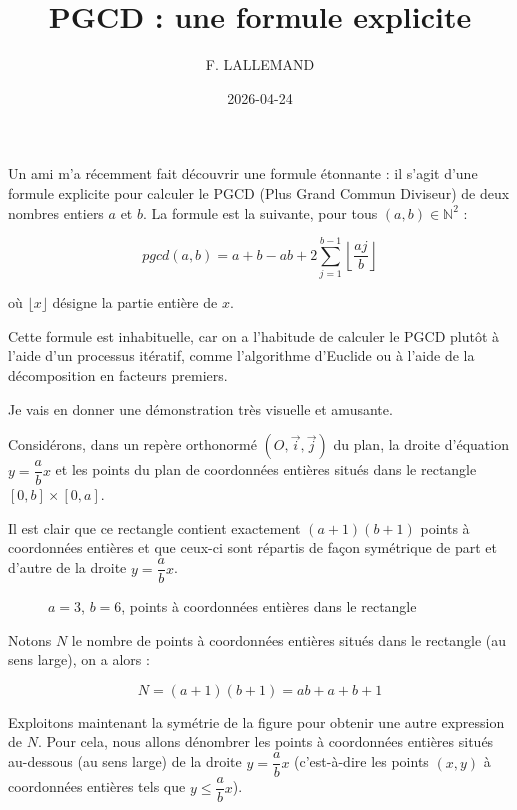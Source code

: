\documentclass[11pt,a4paper]{article}
\title{PGCD : une formule explicite}
\author{F. LALLEMAND}
\date{2026-04-24}
\begin{document}
\maketitle


Un ami m'a récemment fait découvrir une formule étonnante : il s'agit
d'une formule explicite pour calculer le PGCD (Plus Grand Commun
Diviseur) de deux nombres entiers \(a\) et \(b\). La formule est la
suivante, pour tous \((a,b) \in \mathbb{N}^2\) :

\[\boxed{pgcd(a,b) = a + b - ab + 2 \sum _{j=1}^{b-1} \left\lfloor \frac{aj}{b} \right\rfloor}\]

où \(\lfloor x \rfloor\) désigne la partie entière de \(x\).

Cette formule est inhabituelle, car on a l'habitude de calculer le PGCD
plutôt à l'aide d'un processus itératif, comme l'algorithme d'Euclide ou
à l'aide de la décomposition en facteurs premiers.

Je vais en donner une démonstration très visuelle et amusante.

Considérons, dans un repère orthonormé \((O, \vec{i}, \vec{j})\) du
plan, la droite d'équation \(y = \dfrac{a}{b}x\) et les points du plan
de coordonnées entières situés dans le rectangle \([0,b] \times [0,a]\).

Il est clair que ce rectangle contient exactement \((a+1)(b+1)\) points à
coordonnées entières et que ceux-ci sont répartis de façon symétrique de
part et d'autre de la droite \(y = \dfrac{a}{b}x\).

\begin{figure}[h]
  \centering
{}
\caption{$a=3$, $b=6$, points à coordonnées entières dans le rectangle}
\end{figure}

Notons $N$ le nombre de points à coordonnées entières situés dans le rectangle (au sens large), on a alors : 

\[N = (a+1)(b+1) = ab + a + b + 1\]

Exploitons maintenant la symétrie de la figure pour obtenir une autre expression de $N$. Pour cela, nous allons dénombrer les points à coordonnées entières situés au-dessous (au sens large) de la droite \(y = \dfrac{a}{b}x\) (c'est-à-dire les points \((x,y)\) à coordonnées entières tels que \(y \leqslant \dfrac{a}{b}x\)).
\end{document}
